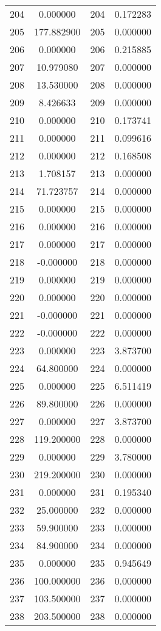 \documentclass[12pt]{article}
\begin{document}
\begin{longtable}{@{}cccc@{}}
204 & 0.000000 & 204 & 0.172283 \\
205 & 177.882900 & 205 & 0.000000 \\
206 & 0.000000 & 206 & 0.215885 \\
207 & 10.979080 & 207 & 0.000000 \\
208 & 13.530000 & 208 & 0.000000 \\
209 & 8.426633 & 209 & 0.000000 \\
210 & 0.000000 & 210 & 0.173741 \\
211 & 0.000000 & 211 & 0.099616 \\
212 & 0.000000 & 212 & 0.168508 \\
213 & 1.708157 & 213 & 0.000000 \\
214 & 71.723757 & 214 & 0.000000 \\
215 & 0.000000 & 215 & 0.000000 \\
216 & 0.000000 & 216 & 0.000000 \\
217 & 0.000000 & 217 & 0.000000 \\
218 & -0.000000 & 218 & 0.000000 \\
219 & 0.000000 & 219 & 0.000000 \\
220 & 0.000000 & 220 & 0.000000 \\
221 & -0.000000 & 221 & 0.000000 \\
222 & -0.000000 & 222 & 0.000000 \\
223 & 0.000000 & 223 & 3.873700 \\
224 & 64.800000 & 224 & 0.000000 \\
225 & 0.000000 & 225 & 6.511419 \\
226 & 89.800000 & 226 & 0.000000 \\
227 & 0.000000 & 227 & 3.873700 \\
228 & 119.200000 & 228 & 0.000000 \\
229 & 0.000000 & 229 & 3.780000 \\
230 & 219.200000 & 230 & 0.000000 \\
231 & 0.000000 & 231 & 0.195340 \\
232 & 25.000000 & 232 & 0.000000 \\
233 & 59.900000 & 233 & 0.000000 \\
234 & 84.900000 & 234 & 0.000000 \\
235 & 0.000000 & 235 & 0.945649 \\
236 & 100.000000 & 236 & 0.000000 \\
237 & 103.500000 & 237 & 0.000000 \\
238 & 203.500000 & 238 & 0.000000 \\

\end{longtable}
\end{document}

